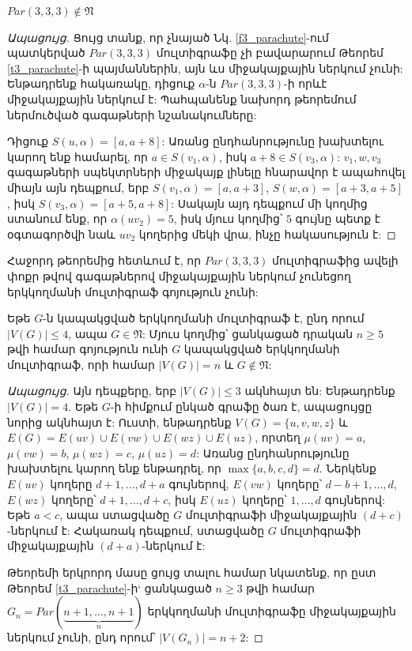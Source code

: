 \begin{remark}
\label{r3_parachute_333}
$Par(3,3,3) \notin \mathfrak{N}$
\end{remark}
\begin{proof}[Ապացույց]
Ցույց տանք, որ չնայած Նկ. \ref{f3_parachute}-ում պատկերված $Par(3,3,3)$ մուլտիգրաֆը չի բավարարում Թեորեմ \ref{t3_parachute}-ի պայմաններին, այն ևս միջակայքային ներկում չունի: Ենթադրենք հակառակը, դիցուք $\alpha$-ն $Par(3,3,3)$-ի որևէ միջակայքային ներկում է: Պահպանենք նախորդ թեորեմում ներմուծված գագաթների նշանակումները:

Դիցուք $S(u,\alpha)=[a,a+8]$: Առանց ընդհանրությունը խախտելու կարող ենք համարել, որ $a \in S(v_1,\alpha)$, իսկ $a+8 \in S(v_3, \alpha)$: $v_1, w, v_3$ գագաթների սպեկտրների միջակայք լինելը հնարավոր է ապահովել միայն այն դեպքում, երբ $S(v_1,\alpha)=[a,a+3]$, $S(w,\alpha)=[a+3,a+5]$, իսկ $S(v_3,\alpha)=[a+5,a+8]$: Սակայն այդ դեպքում մի կողմից ստանում ենք, որ $\alpha(uv_2)=5$, իսկ մյուս կողմից՝ $5$ գույնը պետք է օգտագործվի նաև $uv_2$ կողերից մեկի վրա, ինչը հակասություն է:
\end{proof}

Հաջորդ թեորեմից հետևում է, որ $Par(3,3,3)$ մուլտիգրաֆից ավելի փոքր թվով գագաթներով միջակայքային ներկում չունեցող երկկողմանի մուլտիգրաֆ գոյություն չունի:

\begin{theorem}
\label{t3_bipartite_multi_4} Եթե $G$-ն կապակցված երկկողմանի մուլտիգրաֆ է, ընդ որում $\vert V(G)\vert\leq 4$, ապա $G\in \mathfrak{N}$: Մյուս կողմից՝ ցանկացած դրական $n \geq 5$ թվի համար գոյություն ունի $G$ կապակցված երկկողմանի մուլտիգրաֆ, որի համար $|V(G)|=n$ և $G\notin \mathfrak{N}$:
\end{theorem}
\begin{proof}[Ապացույց]
Այն դեպքերը, երբ $\vert V(G)\vert\leq 3$ ակնհայտ են: Ենթադրենք $\vert
V(G)\vert= 4$. Եթե $G$-ի հիմքում ընկած գրաֆը ծառ է, ապացույցը նորից ակնհայտ է: Ուստի, ենթադրենք $V(G)=\{u,v,w,z\}$ և
$E(G)=E(uv)\cup E(vw)\cup E(wz)\cup E(uz)$, որտեղ $\mu(uv)=a$,
$\mu(vw)=b$, $\mu(wz)=c$, $\mu(uz)=d$: Առանց ընդհանրությունը խախտելու կարող ենք ենթադրել, որ ${\max} \{a,b,c,d\}=d$. Ներկենք $E(uv)$ կողերը
$d+1,\ldots,d+a$ գույներով, $E(vw)$ կողերը՝ 
$d-b+1,\ldots,d$, $E(wz)$ կողերը՝ $d+1,\ldots,d+c$,
իսկ $E(uz)$ կողերը՝ $1,\ldots,d$ գույներով: Եթե $a<c$, ապա ստացվածը $G$ մուլտիգրաֆի միջակայքային $(d+c)$-ներկում է: Հակառակ դեպքում, ստացվածը $G$ մուլտիգրաֆի միջակայքային $(d+a)$-ներկում է:

Թեորեմի երկրորդ մասը ցույց տալու համար նկատենք, որ ըստ Թեորեմ \ref{t3_parachute}-ի` ցանկացած $n \geq 3$ թվի համար $G_n = Par(\underbrace{n+1,\ldots,n+1}_{n})$ երկկողմանի մուլտիգրաֆը միջակայքային ներկում չունի, ընդ որում՝ $|V(G_n)|=n+2$:
\end{proof}

